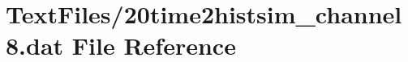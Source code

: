 \hypertarget{20time2histsim__channel8_8dat}{}\section{Text\+Files/20time2histsim\+\_\+channel8.dat File Reference}
\label{20time2histsim__channel8_8dat}
